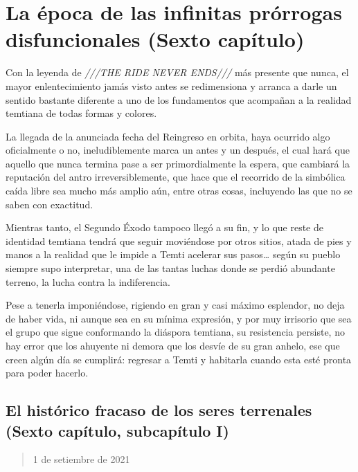 \documentclass[
  spanish,
]{book}
\begin{document}
\hypertarget{la-uxe9poca-de-las-infinitas-pruxf3rrogas-disfuncionales-sexto-capuxedtulo}{%
\chapter{La época de las infinitas prórrogas disfuncionales (Sexto capítulo)}\label{la-uxe9poca-de-las-infinitas-pruxf3rrogas-disfuncionales-sexto-capuxedtulo}}

Con la leyenda de \emph{///THE RIDE NEVER ENDS///} más presente que nunca, el mayor enlentecimiento jamás visto antes se redimensiona y arranca a darle un sentido bastante diferente a uno de los fundamentos que acompañan a la realidad temtiana de todas formas y colores.

La llegada de la anunciada fecha del Reingreso en orbita, haya ocurrido algo oficialmente o no, ineludiblemente marca un antes y un después, el cual hará que aquello que nunca termina pase a ser primordialmente la espera, que cambiará la reputación del antro irreversiblemente, que hace que el recorrido de la simbólica caída libre sea mucho más amplio aún, entre otras cosas, incluyendo las que no se saben con exactitud.

Mientras tanto, el Segundo Éxodo tampoco llegó a su fin, y lo que reste de identidad temtiana tendrá que seguir moviéndose por otros sitios, atada de pies y manos a la realidad que le impide a Temti acelerar sus pasos\ldots{} según su pueblo siempre supo interpretar, una de las tantas luchas donde se perdió abundante terreno, la lucha contra la indiferencia.

Pese a tenerla imponiéndose, rigiendo en gran y casi máximo esplendor, no deja de haber vida, ni aunque sea en su mínima expresión, y por muy irrisorio que sea el grupo que sigue conformando la diáspora temtiana, su resistencia persiste, no hay error que los ahuyente ni demora que los desvíe de su gran anhelo, ese que creen algún día se cumplirá: regresar a Temti y habitarla cuando esta esté pronta para poder hacerlo.

\hypertarget{el-histuxf3rico-fracaso-de-los-seres-terrenales-sexto-capuxedtulo-subcapuxedtulo-i}{%
\section{El histórico fracaso de los seres terrenales (Sexto capítulo, subcapítulo I)}\label{el-histuxf3rico-fracaso-de-los-seres-terrenales-sexto-capuxedtulo-subcapuxedtulo-i}}

\begin{quote}
1 de setiembre de 2021
\end{quote}
\end{document}
